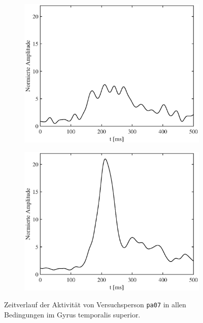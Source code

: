 \documentclass[doc,a4paper,12pt]{apa6}
\begin{document}
\begin{figure}
\begin{subfigure}[c]{0.47\textwidth}
    \label{img:pa07:zeit:sss-mne}
  \end{subfigure}\vspace*{0.04\textwidth}
  \begin{subfigure}[c]{0.47\textwidth}
    \includegraphics[width=\textwidth]{ergebnisse/timecourse/pa07_eve2_mc_lcmv_timecourse_right.eps}
    \label{img:pa07:zeit:mc-lcmv}
  \end{subfigure}\hspace*{0.05\textwidth}
  \begin{subfigure}[c]{0.47\textwidth}
    \includegraphics[width=\textwidth]{ergebnisse/timecourse/pa07_eve2_mc_mne_timecourse_right.eps}
    \label{img:pa07:zeit:mc-mne}
  \end{subfigure}
  \captionsetup{justification=justified}
  \vspace*{3mm}
  \caption[Zeitverlauf der Aktivität von Versuchsperson \texttt{pa07}]{Zeitverlauf der Aktivität von Versuchsperson \texttt{pa07} in allen Bedingungen im Gyrus temporalis superior.}
  \label{img:pa07:zeit}
\end{figure}
\end{document}
